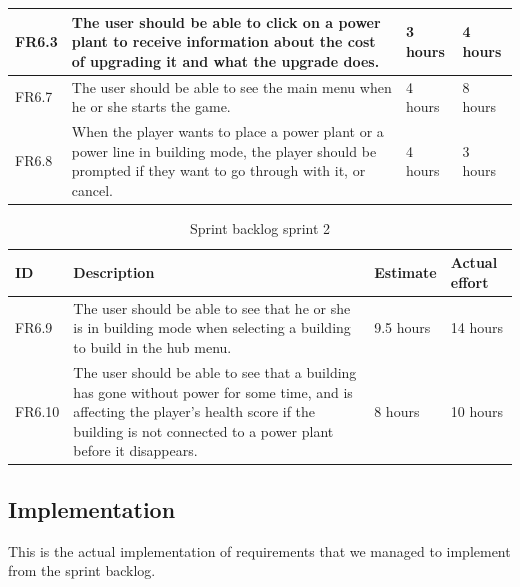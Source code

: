 \begin{table}[H]
\begin{tabular}{| p{1cm} | p{7cm} | p{2cm} | p{2cm} |}
		FR6.3 & The user should be able to click on a power plant to receive information about 
		the cost of upgrading it and what the upgrade does. 
		& 3 hours & 4 hours \\ \hline

		FR6.7 & The user should be able to see the main menu when he or she starts the game. 
		& 4 hours & 8 hours \\ \hline

		FR6.8 & When the player wants to place a power plant or a power line in building mode, 
		the player should be prompted if they want to go through with it, or cancel. 
		& 4 hours & 3 hours \\ \hline
	
	\end{tabular}
	\end{table}
	\begin{table}[H]
	\begin{tabular}{| p{1cm} | p{7cm} | p{2cm} | p{2cm} |}
		\hline
		\rowcolor{gray}
		ID & Description & Estimate & Actual effort \\ \hline

		FR6.9 & The user should be able to see that he or she is in building mode when selecting 
		a building to build in the hub menu. 
		& 9.5 hours & 14 hours \\ \hline

		FR6.10 & The user should be able to see that a building has gone without power for 
		some time, and is affecting the player's health score if the building is not connected 
		to a power plant before it disappears. 
		& 8 hours & 10 hours \\ \hline
	\end{tabular}
	\caption{Sprint backlog sprint 2}
	\label{table:backlogsprint2}
	\end{table}

\subsection{Implementation}
	
	This is the actual implementation of requirements that we managed to implement
	from the sprint backlog.
	
